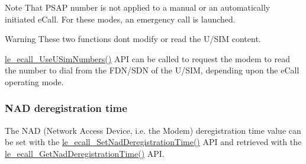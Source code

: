  \begin{DoxyNote}{Note}
That P\+S\+AP number is not applied to a manual or an automatically initiated e\+Call. For these modes, an emergency call is launched.
\end{DoxyNote}
\begin{DoxyWarning}{Warning}
These two functions don\textquotesingle{}t modify or read the U/\+S\+IM content.
\end{DoxyWarning}
\hyperlink{le__ecall__interface_8h_a034c442fd7c6650ed956822a561c0104}{le\+\_\+ecall\+\_\+\+Use\+U\+Sim\+Numbers()} A\+PI can be called to request the modem to read the number to dial from the F\+D\+N/\+S\+DN of the U/\+S\+IM, depending upon the e\+Call operating mode.\hypertarget{c_SDD_eCall_le_ecall_configuration_nad}{}\subsubsection{N\+A\+D deregistration time}\label{c_SDD_eCall_le_ecall_configuration_nad}
The N\+AD (Network Access Device, i.\+e. the Modem) deregistration time value can be set with the \hyperlink{le__ecall__interface_8h_a66e454e84db7d337d76bc867b57891a1}{le\+\_\+ecall\+\_\+\+Set\+Nad\+Deregistration\+Time()} A\+PI and retrieved with the \hyperlink{le__ecall__interface_8h_a0f24b673049d51baf132ace25e2fa161}{le\+\_\+ecall\+\_\+\+Get\+Nad\+Deregistration\+Time()} A\+PI.


